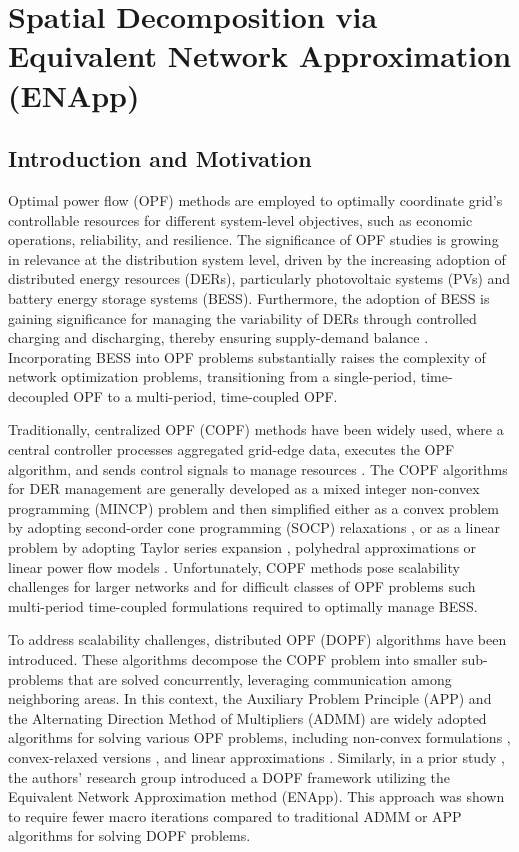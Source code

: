 \clearpage
\section{Spatial Decomposition via Equivalent Network Approximation (ENApp)}

\subsection{Introduction and Motivation}

Optimal power flow (OPF) methods are employed to optimally coordinate grid's controllable resources for different system-level objectives, such as economic operations, reliability, and resilience. The significance of OPF studies is growing in relevance at the distribution system level, driven by the increasing adoption of distributed energy resources (DERs), particularly photovoltaic systems (PVs) and battery energy storage systems (BESS). Furthermore, the adoption of BESS is gaining significance for managing the variability of DERs through controlled charging and discharging, thereby ensuring supply-demand balance \cite{tgangwar}. Incorporating BESS into OPF problems substantially raises the complexity of network optimization problems, transitioning from a single-period, time-decoupled OPF to a multi-period, time-coupled OPF.

Traditionally, centralized OPF (COPF) methods have been widely used, where a central controller processes aggregated grid-edge data, executes the OPF algorithm, and sends control signals to manage resources \cite{spaul}. The COPF algorithms for DER management are generally developed as a mixed integer non-convex programming (MINCP) problem and then simplified either as a convex problem by adopting second-order cone programming (SOCP) relaxations \cite{Wei} \cite{Chowdhury}, or as a linear problem by adopting Taylor series expansion \cite{spaul}, polyhedral approximations \cite{Guo} or linear power flow models \cite{Yuan}. Unfortunately, COPF methods pose scalability challenges for larger networks and for difficult classes of OPF problems such multi-period time-coupled formulations required to optimally manage BESS. 

To address scalability challenges, distributed OPF (DOPF) algorithms have been introduced. These algorithms decompose the COPF problem into smaller sub-problems that are solved concurrently, leveraging communication among neighboring areas. In this context, the Auxiliary Problem Principle (APP) and the Alternating Direction Method of Multipliers (ADMM) are widely adopted algorithms for solving various OPF problems, including non-convex formulations \cite{Fazio}, convex-relaxed versions \cite{Zheng, Wang, Biswas}, and linear approximations \cite{Paul2}. Similarly, in a prior study \cite{Sadnan}, the authors' research group introduced a DOPF framework utilizing the Equivalent Network Approximation method (ENApp). This approach was shown to require fewer macro iterations compared to traditional ADMM or APP algorithms for solving DOPF problems.

